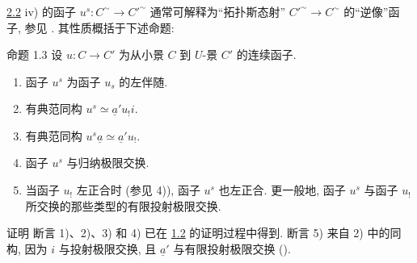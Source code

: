 \subsubsection{}

\hyperref[III.prop2.2]{2.2} iv) 的函子 $u^s:C^{\sim}\rightarrow {C'}^{\sim}$
通常可解释为“拓扑斯态射” ${C'}^{\sim}\rightarrow C^{\sim}$ 的“逆像”函子,
参见 .
其性质概括于下述命题:

\begin{enonce*}{命题 1.3}
设 $u:C\rightarrow C'$ 为从小景 $C$ 到 $U$-景 $C'$ 的连续函子.
\begin{enumerate}
\renewcommand{\labelenumi}{\theenumi)}
\item 函子 $u^s$ 为函子 $u_s$ 的左伴随.

\item 有典范同构 $u^s\simeq \underline{a}'u_{!}i$.

\item 有典范同构 $u^s\underline{a}\simeq \underline{a}'u_{!}$.

\item 函子 $u^s$ 与归纳极限交换.

\item 当函子 $u_{!}$ 左正合时 (参见  4)),
函子 $u^s$ 也左正合. 更一般地, 函子 $u^s$ 与函子 $u_{!}$ 所交换的那些类型的有限投射极限交换.
\end{enumerate}
\end{enonce*}

\begin{enonce*}[remark]{证明}
断言 1)、2)、3) 和 4) 已在 \hyperref[III.prop1.2]{1.2} 的证明过程中得到.
断言 5) 来自 2) 中的同构, 因为 $i$ 与投射极限交换,
且 $\underline{a}'$ 与有限投射极限交换 ().
\end{enonce*}

